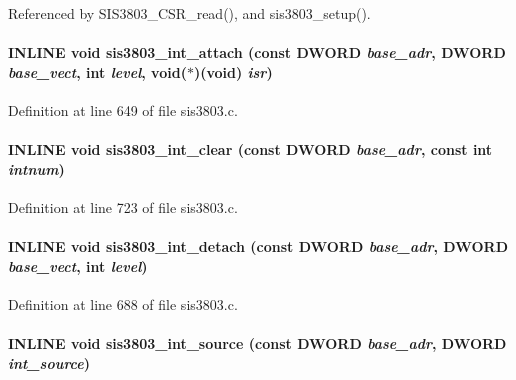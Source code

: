 Referenced by SIS3803\_\-CSR\_\-read(), and sis3803\_\-setup().
\paragraph[{sis3803\_\-int\_\-attach}]{\setlength{\rightskip}{0pt plus 5cm}INLINE void sis3803\_\-int\_\-attach (const {\bf DWORD} {\em base\_\-adr}, \/  {\bf DWORD} {\em base\_\-vect}, \/  int {\em level}, \/  void($\ast$)(void) {\em isr})}\hfill\label{sis3803_8h_a6e11cff7804adfe841ff951446331893}


Definition at line 649 of file sis3803.c.
\paragraph[{sis3803\_\-int\_\-clear}]{\setlength{\rightskip}{0pt plus 5cm}INLINE void sis3803\_\-int\_\-clear (const {\bf DWORD} {\em base\_\-adr}, \/  const int {\em intnum})}\hfill\label{sis3803_8h_ab3c03e7265aa3909a15a945a44255fd1}


Definition at line 723 of file sis3803.c.
\paragraph[{sis3803\_\-int\_\-detach}]{\setlength{\rightskip}{0pt plus 5cm}INLINE void sis3803\_\-int\_\-detach (const {\bf DWORD} {\em base\_\-adr}, \/  {\bf DWORD} {\em base\_\-vect}, \/  int {\em level})}\hfill\label{sis3803_8h_a18dbc998ed925f1f96f9c90a713fc5f3}


Definition at line 688 of file sis3803.c.
\paragraph[{sis3803\_\-int\_\-source}]{\setlength{\rightskip}{0pt plus 5cm}INLINE void sis3803\_\-int\_\-source (const {\bf DWORD} {\em base\_\-adr}, \/  {\bf DWORD} {\em int\_\-source})}\hfill\label{sis3803_8h_a8e196e5ec8a964a50bd801e8be0c604e}


